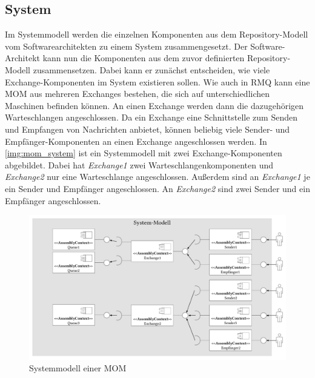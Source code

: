 \subsection{System}
Im Systemmodell werden die einzelnen Komponenten aus dem Repository-Modell vom Softwarearchitekten zu einem System zusammengesetzt. Der Software-Architekt kann nun die Komponenten aus dem zuvor definierten Repository-Modell zusammensetzen. Dabei kann er zunächst entscheiden, wie viele Exchange-Komponenten im System existieren sollen. Wie auch in RMQ kann eine MOM aus mehreren Exchanges bestehen, die sich auf unterschiedlichen Maschinen befinden können. An einen Exchange werden dann die dazugehörigen Warteschlangen angeschlossen. Da ein Exchange eine Schnittstelle zum Senden und Empfangen von Nachrichten anbietet, können beliebig viele Sender- und Empfänger-Komponenten an einen Exchange angeschlossen werden. In \autoref{img:mom_system} ist ein Systemmodell mit zwei Exchange-Komponenten abgebildet. Dabei hat \emph{Exchange1} zwei Warteschlangenkomponenten und \emph{Exchange2} nur eine Warteschlange angeschlossen. Außerdem sind an \emph{Exchange1} je ein Sender und Empfänger angeschlossen. An \emph{Exchange2} sind zwei Sender und ein Empfänger angeschlossen. 

\begin{figure}
\center
  \includegraphics[width=1.4\textwidth, angle=90]{images/modelling/modelingSystem.pdf}
  \caption{Systemmodell einer MOM}
  \label{img:mom_system}
\end{figure}
